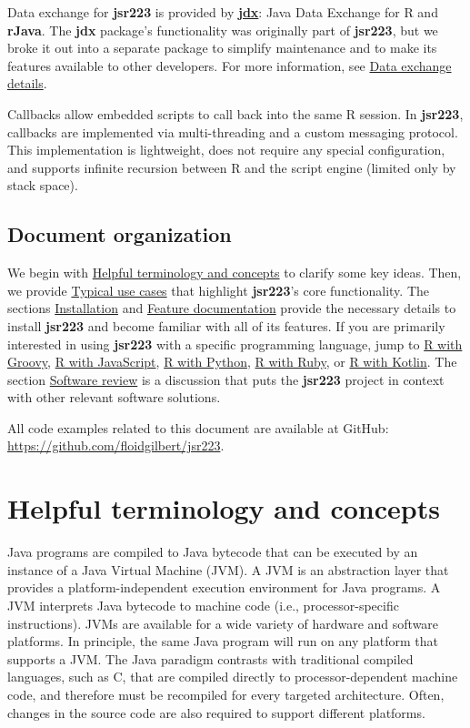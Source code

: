 \documentclass[
article,
11pt, %
a4paper, %
oneside, %
headinclude,footinclude, %
]{scrartcl}
\theoremstyle{definition} %
\theoremstyle{plain} %
\theoremstyle{remark} %
\newcommand{\pkg}[1]{\textbf{#1}}
\newcommand{\CRANpkg}[1]{\href{https://CRAN.R-project.org/package=#1}{\pkg{#1}}}
\begin{document}
Data exchange for \pkg{jsr223} is provided by \CRANpkg{jdx}: Java Data Exchange for R and \pkg{rJava}. The \pkg{jdx} package's functionality was originally part of \pkg{jsr223}, but we broke it out into a separate package to simplify maintenance and to make its features available to other developers. For more information, see \hyperlink{data-exchange-details}{Data exchange details}.

Callbacks allow embedded scripts to call back into the same R session. In \pkg{jsr223}, callbacks are implemented via multi-threading and a custom messaging protocol. This implementation is lightweight, does not require any special configuration, and supports infinite recursion between R and the script engine (limited only by stack space).

\subsection{Document organization}

We begin with \hyperlink{helpful-terminology-and-concepts}{Helpful terminology and concepts} to clarify some key ideas. Then, we provide \hyperlink{typical-use-cases}{Typical use cases} that highlight \pkg{jsr223}'s core functionality. The sections \hyperlink{installation}{Installation} and \hyperlink{feature-documentation}{Feature documentation} provide the necessary details to install \pkg{jsr223} and become familiar with all of its features. If you are primarily interested in using \pkg{jsr223} with a specific programming language, jump to \hyperlink{r-with-groovy}{R with Groovy}, \hyperlink{r-with-javascript}{R with JavaScript}, \hyperlink{r-with-python}{R with Python}, \hyperlink{r-with-ruby}{R with Ruby}, or \hyperlink{r-with-kotlin}{R with Kotlin}. The section \hyperlink{software-review}{Software review} is a discussion that puts the \pkg{jsr223} project in context with other relevant software solutions.

All code examples related to this document are available at GitHub: \url{https://github.com/floidgilbert/jsr223}.

\hypertarget{helpful-terminology-and-concepts}{}
\section{Helpful terminology and concepts}

Java programs are compiled to Java bytecode that can be executed by an instance of a Java Virtual Machine (JVM). A JVM is an abstraction layer that provides a platform-independent execution environment for Java programs. A JVM interprets Java bytecode to machine code (i.e., processor-specific instructions). JVMs are available for a wide variety of hardware and software platforms. In principle, the same Java program will run on any platform that supports a JVM. The Java paradigm contrasts with traditional compiled languages, such as C, that are compiled directly to processor-dependent machine code, and therefore must be recompiled for every targeted architecture. Often, changes in the source code are also required to support different platforms.
\end{document}
